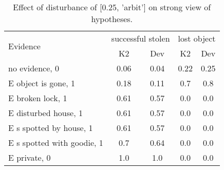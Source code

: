 \begin{table}\begin{tabular}{l|cc|cc}\toprule\multirow{2}{*}{Evidence} & \multicolumn{2}{c}{successful stolen}& \multicolumn{2}{c}{lost object}\\& {K2} & {Dev}& {K2} & {Dev}\\\midrule
no evidence, 0 & 0.06&0.04&0.22&0.25\\E object is gone, 1 & \cellcolor{Bittersweet}0.18&\cellcolor{Bittersweet}0.11&\cellcolor{Bittersweet}0.7&\cellcolor{Bittersweet}0.8\\E broken lock, 1 & 0.61&0.57&0.0&0.0\\E disturbed house, 1 & 0.61&0.57&0.0&0.0\\E s spotted by house, 1 & 0.61&0.57&0.0&0.0\\E s spotted with goodie, 1 & \cellcolor{Bittersweet}0.7&\cellcolor{Bittersweet}0.64&0.0&0.0\\E private, 0 & 1.0&1.0&0.0&0.0\\\bottomrule\end{tabular}\caption{Effect of disturbance of [0.25, 'arbit'] on strong view of hypotheses.}\end{table}